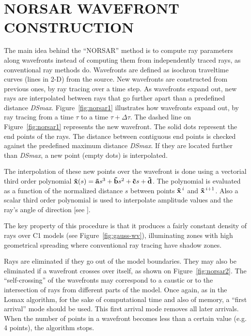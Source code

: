 \section{NORSAR WAVEFRONT CONSTRUCTION}

The main idea behind the ``NORSAR'' method \cite[]{Vinje}
is to compute ray parameters 
along wavefronts instead of computing them from independently traced
rays, as conventional ray methods do. Wavefronts are defined as
isochron traveltime curves (lines in \mbox{2-D}) from the source. 
New wavefronts are constructed from previous ones, by ray tracing over 
a time step. As wavefronts expand out, new rays are interpolated
between rays that go further apart than a predefined distance {\it DSmax\/}.
Figure~\ref{fig:norsar1} illustrates how wavefronts expand out, by ray 
tracing from a time $\tau$ to a time $\tau + \Delta \tau$. The
dashed line on Figure~\ref{fig:norsar1} represents the new
wavefront. The
solid dots represent the end points of the rays. The distance
between contiguous end points is checked against the predefined maximum
distance {\it DSmax\/}. If they are located further than 
{\it DSmax\/}, a new point (empty dots) is interpolated.

The interpolation of these
new points over the wavefront is done using a vectorial
third order polynomial
${\bf \vec{x}}(s) = {\bf \vec{a}} s^{3} + {\bf \vec{b}} s^{2} +
{\bf \vec{c}} s + {\bf \vec{d}}$.
The polynomial is evaluated as a function of the normalized
distance $s$ between points ${\bf \vec{x}}^{\, i}$ and 
${\bf \vec{x}}^{\, i+1}$.
Also a scalar third order polynomial is used to interpolate amplitude values
and the ray's angle of direction [see \cite{Vinje}].

The key property of this procedure is that it
produces a fairly constant density of rays over C1 models
\cite[]{Vinje} (see Figure~\ref{fig:gauss-wv}), illuminating
zones with high geometrical spreading where conventional ray tracing
have shadow zones.


Rays are eliminated if they go out of the model boundaries.
They may also be eliminated if a wavefront crosses over itself, as shown on
Figure~\ref{fig:norsar2}. The ``self-crossing'' of the wavefronts may
correspond to a caustic or to the intersection of rays from 
different parts of the model. Once again, as in the Lomax algorithm,
for the sake of computational
time and also of memory, a ``first arrival'' mode should be used.
This first arrival mode removes all later arrivals.
When the number of points in a wavefront becomes less than a certain
value (e.g. 4 points), the algorithm stops.

